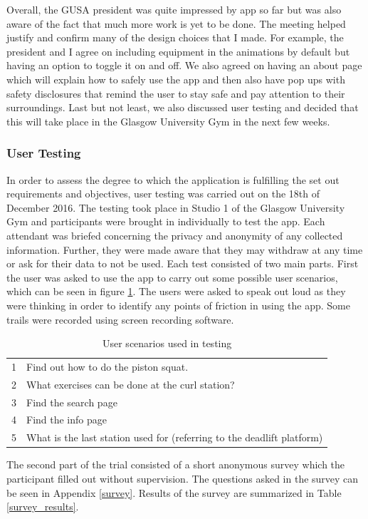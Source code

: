 \documentclass{l4proj}
\begin{document}
Overall, the GUSA president was quite impressed by app so far but was also aware of the fact that much more work is yet to be done. The meeting helped justify and confirm many of the design choices that I made. For example, the president and I agree on including equipment in the animations by default but having an option to toggle it on and off. We also agreed on having an about page which will explain how to safely use the app and then also have pop ups with safety disclosures that remind the user to stay safe and pay attention to their surroundings. Last but not least, we also discussed user testing and decided that this will take place in the Glasgow University Gym in the next few weeks.


\subsubsection{User Testing}
In order to assess the degree to which the application is fulfilling the set out requirements and objectives, user testing was carried out on the 18th of December 2016. The testing took place in Studio 1 of the Glasgow University Gym and participants were brought in individually to test the app. Each attendant was briefed concerning the privacy and anonymity of any collected information. Further, they were made aware that they may withdraw at any time or ask for their data to not be used. Each test consisted of two main parts. First the user was asked to use the app to carry out some possible user scenarios, which can be seen in figure \ref{test_scenarios}. The users were asked to speak out loud as they were thinking in order to identify any points of friction in using the app. Some trails were recorded using screen recording software. 

\begin{table}[h]
\centering
\caption{User scenarios used in testing}
\label{test_scenarios}
\begin{tabular}{ll}
1 & Find out how to do the piston squat.\\
2 & What exercises can be done at the curl station? \\
3 & Find the search page \\
4 & Find the info page \\
5 & What is the last station used for (referring to the deadlift platform)
\end{tabular}
\end{table}

The second part of the trial consisted of a short anonymous survey which the participant filled out without supervision. The questions asked in the survey can be seen in Appendix \ref{survey}. Results of the survey are summarized in Table \ref{survey_results}.
\end{document}

